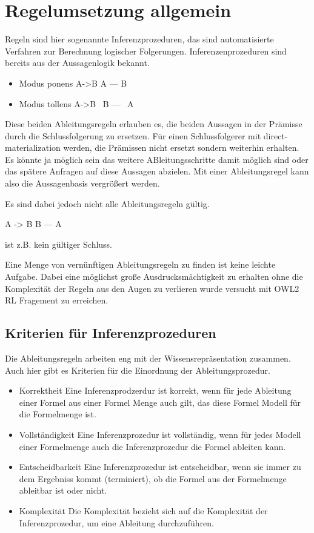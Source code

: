 \section{Regelumsetzung allgemein}
Regeln sind hier sogenannte Inferenzprozeduren, das sind automatisierte Verfahren zur Berechnung logischer Folgerungen. Inferenzenprozeduren sind bereits aus der Aussagenlogik bekannt.

\begin{itemize}
  \item Modus ponens
  A->B
  A
  ---
  B
  \item Modus tollens
  A->B
  ~B
  ---
  ~A
\end{itemize}

Diese beiden Ableitungsregeln erlauben es, die beiden Aussagen in der Prämisse durch die Schlussfolgerung zu ersetzen. Für einen Schlussfolgerer mit direct-materialization werden, die Prämissen nicht ersetzt sondern weiterhin erhalten. Es könnte ja möglich sein das weitere ABleitungsschritte damit möglich sind oder das spätere Anfragen auf diese Aussagen abzielen. Mit einer Ableitungsregel kann also die Aussagenbasis vergrößert werden.

Es sind dabei jedoch nicht alle Ableitungsregeln gültig.

A -> B
B
---
A

ist z.B. kein gültiger Schluss.

Eine Menge von vernünftigen Ableitungsregeln zu finden ist keine leichte Aufgabe. Dabei eine möglichst große Ausdrucksmächtigkeit zu erhalten ohne die Komplexität der Regeln aus den Augen zu verlieren wurde versucht mit OWL2 RL Fragement zu erreichen.

\subsection{Kriterien für Inferenzprozeduren}
Die Ableitungsregeln arbeiten eng mit der Wissensrepräsentation zusammen. Auch hier gibt es Kriterien für die Einordnung der Ableitungsprozedur.

\begin{itemize}
  \item Korrektheit
  Eine Inferenzprodzerdur ist korrekt, wenn für jede Ableitung einer Formel aus einer Formel Menge auch gilt, das diese Formel Modell für die Formelmenge ist.
  \item Vollständigkeit
  Eine Inferenzprozedur ist vollständig, wenn für jedes Modell einer Formelmenge auch die Inferenzprozedur die Formel ableiten kann.
  \item Entscheidbarkeit
  Eine Inferenzprozedur ist entscheidbar, wenn sie immer zu dem Ergebniss kommt (terminiert), ob die Formel aus der Formelmenge ableitbar ist oder nicht.
  \item Komplexität
  Die Komplexität bezieht sich auf die Komplexität der Inferenzprozedur, um eine Ableitung durchzuführen.
\end{itemize}


